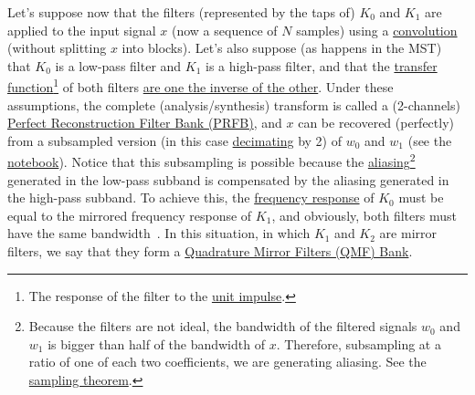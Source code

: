 Let's suppose now that the filters (represented by the taps of) $K_0$
and $K_1$ are applied to the input signal $x$ (now a sequence of $N$
samples) using a
\href{https://en.wikipedia.org/wiki/Kernel_(image_processing)}{convolution}
(without splitting $x$ into blocks). Let's also suppose (as happens in
the MST) that $K_0$ is a low-pass filter and $K_1$ is a high-pass
filter, and that the
\href{https://en.wikipedia.org/wiki/Filter_(signal_processing)#The_transfer_function}{transfer
  function}\footnote{The response of the filter to the
  \href{https://en.wikipedia.org/?title=Unit_impulse&redirect=no}{unit
    impulse}.} of both filters
\href{https://en.wikipedia.org/wiki/Filter_bank#Perfect_reconstruction_filter_banks}{are
  one the inverse of the other}. Under these assumptions, the complete
(analysis/synthesis) transform is called a (2-channels)
\href{https://en.wikipedia.org/wiki/Filter_bank#Perfect_reconstruction_filter_banks}{Perfect
  Reconstruction Filter Bank (PRFB)}, and $x$ can be recovered
(perfectly) from a subsampled version (in this case
\href{https://en.wikipedia.org/wiki/Downsampling_(signal_processing)}{decimating}
by 2) of $w_0$ and $w_1$ (see the
\href{https://github.com/Tecnologias-multimedia/intercom/blob/master/docs/PRFB.ipynb}{notebook}). Notice
that this subsampling is possible because the
\href{https://en.wikipedia.org/wiki/Aliasing}{aliasing}\footnote{Because
  the filters are not ideal, the bandwidth of the filtered signals
  $w_0$ and $w_1$ is bigger than half of the bandwidth of
  $x$. Therefore, subsampling at a ratio of one of each two
  coefficients, we are generating aliasing. See the
  \href{https://en.wikipedia.org/wiki/Nyquist-Shannon_sampling_theorem}{sampling
    theorem}.}  generated in the low-pass subband is compensated by
the aliasing generated in the high-pass subband. To achieve this, the
\href{https://en.wikipedia.org/wiki/Filter_(signal_processing)#The_transfer_function}{frequency
  response} of $K_0$ must be equal to the mirrored frequency response of
$K_1$, and obviously, both filters must have the same
bandwidth~\cite{sayood2017introduction}. In this situation, in which
$K_1$ and $K_2$ are mirror filters, we say that they form a
\href{https://en.wikipedia.org/wiki/Quadrature_mirror_filter}{Quadrature
  Mirror Filters (QMF) Bank}.

